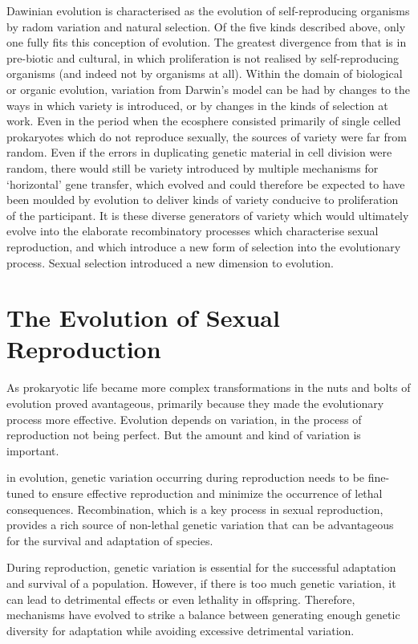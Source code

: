 Dawinian evolution is characterised as the evolution of self-reproducing organisms by radom variation and natural selection.
Of the five kinds described above, only one fully fits this conception of evolution.
The greatest divergence from that is in pre-biotic and cultural, in which proliferation is not realised by self-reproducing organisms (and indeed not by organisms at all).
Within the domain of biological or organic evolution, variation from Darwin's model can be had by changes to the ways in which variety is introduced, or by changes in the kinds of selection at work.
Even in the period when the ecosphere consisted primarily of single celled prokaryotes which do not reproduce sexually, the sources of variety were far from random.
Even if the errors in duplicating genetic material in cell division were random, there would still be variety introduced by multiple mechanisms for `horizontal' gene transfer, which evolved and could therefore be expected to have been moulded by evolution to deliver kinds of variety conducive to proliferation of the participant.
It is these diverse generators of variety which would ultimately evolve into the elaborate recombinatory processes which characterise sexual reproduction, and which introduce a new form of selection into the evolutionary process.
Sexual selection introduced a new dimension to evolution.


\section{The Evolution of Sexual Reproduction}

As prokaryotic life became more complex transformations in the nuts and bolts of evolution proved avantageous, primarily because they made the evolutionary process more effective.
Evolution depends on variation, in the process of reproduction not being perfect.
But the amount and kind of variation is important.

in evolution, genetic variation occurring during reproduction needs to be fine-tuned to ensure effective reproduction and minimize the occurrence of lethal consequences. Recombination, which is a key process in sexual reproduction, provides a rich source of non-lethal genetic variation that can be advantageous for the survival and adaptation of species.

During reproduction, genetic variation is essential for the successful adaptation and survival of a population. However, if there is too much genetic variation, it can lead to detrimental effects or even lethality in offspring. Therefore, mechanisms have evolved to strike a balance between generating enough genetic diversity for adaptation while avoiding excessive detrimental variation.

